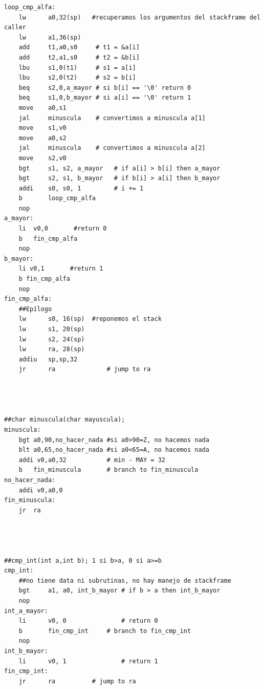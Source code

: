 \documentclass[a4paper,10pt]{article}
\numberwithin{equation}{section}
\numberwithin{figure}{section}
\begin{document}
\begin{lstlisting}
loop_cmp_alfa:
    lw      a0,32(sp)   #recuperamos los argumentos del stackframe del caller
    lw      a1,36(sp)
    add     t1,a0,s0     # t1 = &a[i]
    add     t2,a1,s0     # t2 = &b[i]
    lbu     s1,0(t1)     # s1 = a[i]
    lbu     s2,0(t2)     # s2 = b[i]
    beq     s2,0,a_mayor # si b[i] == '\0' return 0
    beq     s1,0,b_mayor # si a[i] == '\0' return 1
    move    a0,s1        
    jal     minuscula    # convertimos a minuscula a[1]
    move    s1,v0
    move    a0,s2
    jal     minuscula    # convertimos a minuscula a[2]
    move    s2,v0
    bgt	    s1, s2, a_mayor	  # if a[i] > b[i] then a_mayor
    bgt     s2, s1, b_mayor   # if b[i] > a[i] then b_mayor
    addi    s0, s0, 1         # i += 1
    b       loop_cmp_alfa
    nop
a_mayor:
    li  v0,0       #return 0
    b   fin_cmp_alfa
    nop
b_mayor:                            
    li v0,1       #return 1
    b fin_cmp_alfa
    nop
fin_cmp_alfa:
    ##Epílogo
    lw		s0, 16(sp)	#reponemos el stack 
    lw      s1, 20(sp)
    lw      s2, 24(sp)
    lw      ra, 28(sp)
    addiu   sp,sp,32
    jr		ra				# jump to ra
    
    


##char minuscula(char mayuscula);
minuscula:
    bgt a0,90,no_hacer_nada #si a0>90=Z, no hacemos nada
    blt a0,65,no_hacer_nada #si a0<65=A, no hacemos nada
    addi v0,a0,32           # min - MAY = 32
    b	fin_minuscula	    # branch to fin_minuscula
no_hacer_nada:
    addi v0,a0,0
fin_minuscula:
    jr  ra




##cmp_int(int a,int b); 1 si b>a, 0 si a>=b
cmp_int:
    ##no tiene data ni subrutinas, no hay manejo de stackframe
    bgt		a1, a0, int_b_mayor	# if b > a then int_b_mayor
    nop
int_a_mayor:
    li		v0, 0		        # return 0
    b		fin_cmp_int		# branch to fin_cmp_int
    nop
int_b_mayor:
    li		v0, 1		        # return 1
fin_cmp_int:
    jr		ra			# jump to ra




\end{lstlisting}
\end{document}
